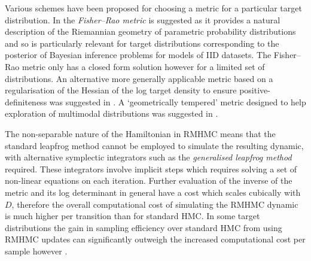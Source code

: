 Various schemes have been proposed for choosing a metric for a particular target distribution. In \citep{girolami2011riemann} the \emph{Fisher--Rao metric} \citep{amari1982differential} is suggested as it provides a natural description of the Riemannian geometry of parametric probability distributions and so is particularly relevant for target distributions corresponding to the posterior of Bayesian inference problems for models of \acs{IID} datasets. The Fisher--Rao metric only has a closed form solution however for a limited set of distributions. An alternative more generally applicable metric based on a regularisation of the Hessian of the log target density to ensure positive-definiteness was suggested in \citep{betancourt2013general}. A `geometrically tempered' metric designed to help exploration of multimodal distributions was suggested in \citep{nishimura2016geometrically}.

The non-separable nature of the Hamiltonian in \ac{RMHMC} means that the standard leapfrog method cannot be employed to simulate the resulting dynamic, with alternative symplectic integrators such as the \emph{generalised leapfrog method} \citep{leimkuhler2004simulating} required. These integrators involve implicit steps which requires solving a set of non-linear equations on each iteration. Further evaluation of the inverse of the metric and its log determinant in general have a cost which scales cubically with $D$, therefore the overall computational cost of simulating the \ac{RMHMC} dynamic is much higher per transition than for standard \ac{HMC}. In some target distributions the gain in sampling efficiency over standard \ac{HMC} from using \ac{RMHMC} updates can significantly outweigh the increased computational cost per sample however \citep{girolami2011riemann,betancourt2013general}. 




